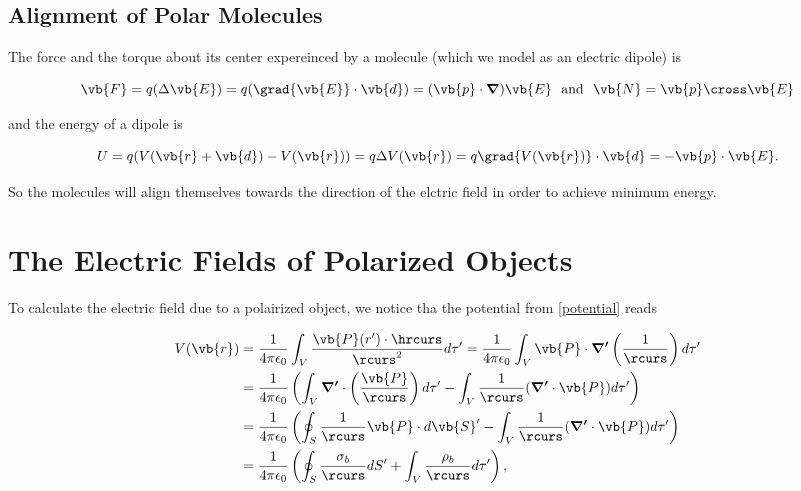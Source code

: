 \documentclass[english,a4paper,12pt]{report}
\begin{document}
\subsection{Alignment of Polar Molecules} \label{alignpolar} 

The force and the torque about its center expereinced by a molecule (which we model as an electric dipole) is 

\begin{equation}
    \vb{F} = q(\Delta \vb{E} ) = q (\grad{\vb{E} } \cdot \vb{d}) = (\vb{p}  \cdot \boldsymbol{\nabla }) \vb{E} ~\text { and }~ \vb{N} = \vb{p} \cross \vb{E}
\end{equation}

and the energy of a dipole is 

\begin{equation}
    U = q(V(\vb{r} + \vb{d} ) - V(\vb{r} )) = q\Delta V(\vb{r} ) = q\grad{V(\vb{r} )}\cdot \vb{d} = - \vb{p} \cdot \vb{E}. 
\end{equation}

So the molecules will align themselves towards the direction of the elctric field in order to achieve minimum energy. 

\section{The Electric Fields of Polarized Objects}

To calculate the electric field due to a polairized object, we notice tha the potential from \cref{potential} reads

\begin{equation}
    \begin{aligned} 
    V(\vb{r} ) &= \frac{1}{4\pi \epsilon_0} \int_{V}^{} \frac{\vb{P} (r')\cdot \hrcurs }{\rcurs ^2}d\tau ' = \frac{1}{4\pi \epsilon_0} \int_{V}^{} \vb{P} \cdot \boldsymbol{\nabla '}\left( \frac{1}{\rcurs }  \right) d\tau ' \\
    &= \frac{1}{4\pi \epsilon_0} \left( \int_{V}^{} \boldsymbol{\nabla '} \cdot \left( \frac{\vb{P} }{\rcurs }  \right) d\tau ' - \int_{V}^{} \frac{1}{\rcurs } (\boldsymbol{\nabla '} \cdot \vb{P}  ) d\tau ' \right) \\
    &= \frac{1}{4\pi \epsilon_0} \left( \oint_{S} \frac{1}{\rcurs }\vb{P} \cdot d\vb{S} '  - \int_{V}^{} \frac{1}{\rcurs } (\boldsymbol{\nabla '} \cdot \vb{P}  ) d\tau ' \right) \\
    &= \frac{1}{4\pi \epsilon_0} \left( \oint_{S} \frac{\sigma _{b} }{\rcurs } dS' + \int_{V}^{} \frac{\rho _{b} }{\rcurs } d\tau ' \right),
    \end{aligned} 
\end{equation}
\end{document}
